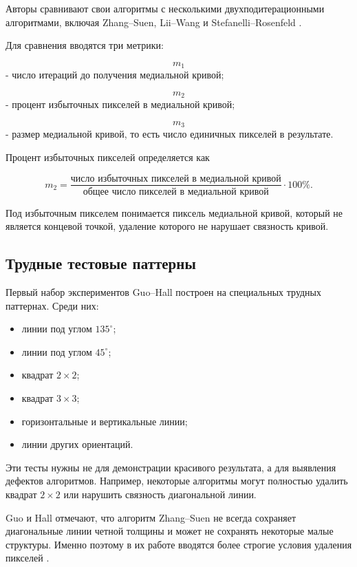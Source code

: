 \documentclass[12pt,a4paper]{article}
\begin{document}
	Авторы сравнивают свои алгоритмы с несколькими двухподитерационными алгоритмами, включая Zhang--Suen, Lii--Wang и Stefanelli--Rosenfeld \cite{guo1989}.
	
	Для сравнения вводятся три метрики:
	
	\[
	m_1
	\]
	- число итераций до получения медиальной кривой;
	
	\[
	m_2
	\]
	- процент избыточных пикселей в медиальной кривой;
	
	\[
	m_3
	\]
	- размер медиальной кривой, то есть число единичных пикселей в результате.
	
	Процент избыточных пикселей определяется как
	
	\[
	m_2 =
	\frac{
		\text{число избыточных пикселей в медиальной кривой}
	}{
		\text{общее число пикселей в медиальной кривой}
	}
	\cdot 100\%.
	\]
	
	Под избыточным пикселем понимается пиксель медиальной кривой, который не является концевой точкой, удаление которого не нарушает связность кривой.
	
	\subsection{Трудные тестовые паттерны}
	
	Первый набор экспериментов Guo--Hall построен на специальных трудных паттернах. Среди них:
	
	\begin{itemize}
		\item линии под углом $135^\circ$;
		\item линии под углом $45^\circ$;
		\item квадрат $2\times2$;
		\item квадрат $3\times3$;
		\item горизонтальные и вертикальные линии;
		\item линии других ориентаций.
	\end{itemize}
	
	Эти тесты нужны не для демонстрации красивого результата, а для выявления дефектов алгоритмов. Например, некоторые алгоритмы могут полностью удалить квадрат $2\times2$ или нарушить связность диагональной линии.
	
	Guo и Hall отмечают, что алгоритм Zhang--Suen не всегда сохраняет диагональные линии четной толщины и может не сохранять некоторые малые структуры. Именно поэтому в их работе вводятся более строгие условия удаления пикселей \cite{guo1989}.
	
\end{document}

